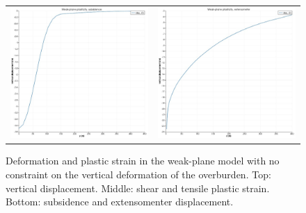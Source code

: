 \documentclass[]{scrreprt}
\begin{document}
\begin{figure}[p]
\begin{center}
\begin{tabular}{cc}
\includegraphics[width=6cm]{wp_only_no_floor_subsidence.pdf} &
\includegraphics[width=6cm]{wp_only_no_floor_extensometer.pdf}
\end{tabular}
\caption{Deformation and plastic strain in the weak-plane model with
  no constraint on the vertical deformation of the overburden.  Top:
  vertical displacement.  Middle: shear and tensile plastic strain.
  Bottom: subsidence and extensomenter displacement.}
\label{wp.no.floow}
\end{center}
\end{figure}
\end{document}
